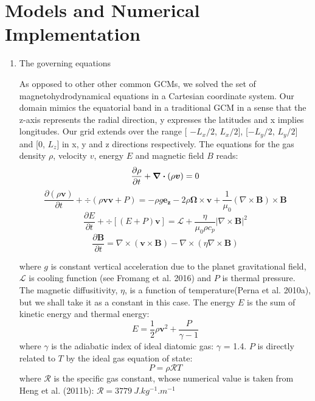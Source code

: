 \documentclass[11pt]{article}
\begin{document}
\section{Models and Numerical Implementation }
\begin{enumerate}
\item The governing equations

As opposed to other other common GCMs, we solved the set of magnetohydrodynamical equations in a Cartesian coordinate system. Our domain mimics the equatorial band in a traditional GCM in a  sense that the z-axis represents the radial direction, y expresses the latitudes and x implies longitudes. 
Our grid extends over the range [ $-L_x/2$, $L_x/2$], [$-L_y/2$, $L_y/2$] and [0, $L_z$] in x, y and z directions respectively.
The equations for the gas density $\rho$, velocity $v$, energy $E$ and magnetic field $B$ reads: 
\begin{equation} 
\frac{\partial \rho}{\partial t} + \div (\rho\bm{v})  = 0 \\
\end{equation}
\begin{equation}
\frac{\partial (\rho \bm{v})}{\partial t} + \div (\rho\bm{v}\bm{v} + P)  = -\rho g \bm{e_z} - 2\rho \bm{\Omega} \times \bm{v} + \frac{1}{\mu_0}(\nabla \times \bm{B}) \times \bm{B}
\end{equation}
\begin{equation}
\frac{\partial E}{\partial t} + \div [(E+P)\bm{v} ]  = \mathcal{L} + \frac{\eta}{\mu_0\rho c_p} \vert \nabla \times \bm{B} \vert^2 
\end{equation}
\begin{equation}
\frac{\partial \bm{B}}{\partial t}  = \nabla \times (\bm{v} \times \bm{B}) - \nabla \times (\eta\nabla \times \bm{B}) 
\end{equation}
 


where $g$ is constant vertical acceleration due to the planet gravitational field, $\bm{\mathcal{L}}$ is cooling function (see Fromang et al. 2016) and $P$ is thermal pressure. The magnetic diffusitivity, $\eta$, is a function of temperature(Perna et al. 2010a), but we shall take it as a constant in this case. The energy $E$ is the sum of kinetic energy and thermal energy:
$$ E = \frac{1}{2}\rho \bm{v}^2 + \frac{P}{\gamma -1}$$ 
where $\gamma$ is the adiabatic index of ideal diatomic gas: $\gamma$  = 1.4.  $P$ is directly related to $T$ by the ideal gas equation of state: 
$$ P = \rho \mathcal{R}T$$
where $\mathcal{R}$ is the specific gas constant, whose numerical value is taken from Heng et al. (2011b): $\mathcal{R} = 3779 \ J.kg^{-1}.m^{-1} $


\end{enumerate}
\end{document}
